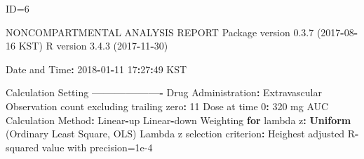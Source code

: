 \documentclass[12pt,]{krantz}
\newenvironment{Shaded}{\begin{snugshade}}{\end{snugshade}}
\newcommand{\KeywordTok}[1]{\textcolor[rgb]{0.13,0.29,0.53}{\textbf{#1}}}
\newcommand{\DecValTok}[1]{\textcolor[rgb]{0.00,0.00,0.81}{#1}}
\newcommand{\FloatTok}[1]{\textcolor[rgb]{0.00,0.00,0.81}{#1}}
\newcommand{\StringTok}[1]{\textcolor[rgb]{0.31,0.60,0.02}{#1}}
\newcommand{\ControlFlowTok}[1]{\textcolor[rgb]{0.13,0.29,0.53}{\textbf{#1}}}
\newcommand{\OperatorTok}[1]{\textcolor[rgb]{0.81,0.36,0.00}{\textbf{#1}}}
\newcommand{\NormalTok}[1]{#1}
\theoremstyle{definition}
\theoremstyle{definition}
\theoremstyle{definition}
\theoremstyle{remark}
\begin{document}
\begin{Shaded}
\begin{Highlighting}[]
\NormalTok{ID=}\DecValTok{6}

\NormalTok{                        NONCOMPARTMENTAL ANALYSIS REPORT}
\NormalTok{                       Package version }\FloatTok{0.3}\NormalTok{.}\DecValTok{7}\NormalTok{ (}\DecValTok{2017}\OperatorTok{-}\DecValTok{08}\OperatorTok{-}\DecValTok{16}\NormalTok{ KST)}
\NormalTok{                          R version }\FloatTok{3.4}\NormalTok{.}\DecValTok{3}\NormalTok{ (}\DecValTok{2017}\OperatorTok{-}\DecValTok{11}\OperatorTok{-}\DecValTok{30}\NormalTok{)}

\NormalTok{Date and Time}\OperatorTok{:}\StringTok{ }\DecValTok{2018}\OperatorTok{-}\DecValTok{01}\OperatorTok{-}\DecValTok{11} \DecValTok{17}\OperatorTok{:}\DecValTok{27}\OperatorTok{:}\DecValTok{49}\NormalTok{ KST}

\NormalTok{Calculation Setting}
\OperatorTok{-------------------}
\NormalTok{Drug Administration}\OperatorTok{:}\StringTok{ }\NormalTok{Extravascular}
\NormalTok{Observation count excluding trailing zero}\OperatorTok{:}\StringTok{ }\DecValTok{11}
\NormalTok{Dose at time }\DecValTok{0}\OperatorTok{:}\StringTok{ }\DecValTok{320}\NormalTok{ mg}
\NormalTok{AUC Calculation Method}\OperatorTok{:}\StringTok{ }\NormalTok{Linear}\OperatorTok{-}\NormalTok{up Linear}\OperatorTok{-}\NormalTok{down}
\NormalTok{Weighting }\ControlFlowTok{for}\NormalTok{ lambda z}\OperatorTok{:}\StringTok{ }\KeywordTok{Uniform}\NormalTok{ (Ordinary Least Square, OLS)}
\NormalTok{Lambda z selection criterion}\OperatorTok{:}\StringTok{ }\NormalTok{Heighest adjusted R}\OperatorTok{-}\NormalTok{squared value with precision=}\FloatTok{1e-4}



\end{Highlighting}
\end{Shaded}
\end{document}
